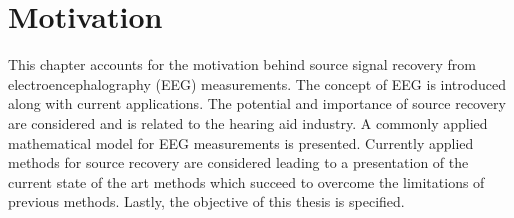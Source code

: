 \chapter{Motivation}\label{ch:motivation}
This chapter accounts for the motivation behind source signal recovery from electroencephalography (EEG) measurements. The concept of EEG is introduced along with current applications. The potential and importance of source recovery are considered and is related to the hearing aid industry. A commonly applied mathematical model for EEG measurements is presented. Currently applied methods for source recovery are considered leading to a presentation of the current state of the art methods which succeed to overcome the limitations of previous methods. Lastly, the objective of this thesis is specified.          


